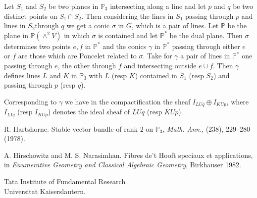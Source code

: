 \begin{EXP1}
Let $S_1$ and $S_2$ be two planes in $\mathbb{P}_3$ intersecting along a line and let $p$ and $q$ be two distinct points on $S_1\cap S_2$. Then  considering the lines in $S_1$ passing through $p$ and lines in $S_2$\pageoriginale through $q$ we get a conic $\sigma$ in $G$, which is a pair of lines. Let $\mathbb{P}$ be the plane in $\mathbb{P}\left(\displaystyle\mathop{\wedge}^{2} V\right)$ in which $\sigma$ is contained and let $\mathbb{P}^{\ast}$ be the dual plane. Then $\sigma$ determines two points $e,f$ in $\mathbb{P}^{\ast}$ and the conics $\gamma$ in $\mathbb{P}^{\ast}$ passing through either $e$ or $f$ are those which are Poncelet related to $\sigma$. Take for $\gamma$ a pair of lines in $\mathbb{P}^{\ast}$ one passing through $e$, the other through $f$ and intersecting outside $e\cup f$. Then $\gamma$ defines lines $L$ and $K$ in $\mathbb{P}_3$ with $L$ (resp $K$) contained in $S_1$ (resp $S_2$) and passing through $p$ (resp $q$). 
\end{EXP1}

Corresponding to $\gamma$ we have in the compactification the sheaf $I_{L U q}\oplus I_{K U p}$, where $I_{L I q}$ (resp $I_{K U p}$) denotes the ideal sheaf of $LUq$ (resp $KUp$).


\begin{thebibliography}{99}
{R. Hartshorne.} Stable vector bundle of rank $2$ on
$\mathbb{P}_3$, \textit{Math. Ann}., (238), 229--280 (1978).

{A. Hirschowitz and M. S. Narasimhan.} Fibres de't Hooft
speciaux et applications, in \textit{Enumerative Geometry and
  Classical Algebraic Geometry}, Birkhauser 1982.
\end{thebibliography}

\vskip 1cm

\noindent
Tata Institute of Fundamental Research\\
Universitat Kaiserslautern.
